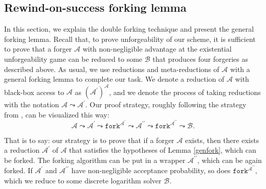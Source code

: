 \documentclass{mrl}
\theoremstyle{definition}
\numberwithin{theorem}{subsection}
\newcommand{\adversary}{\mathcal{A}}
\newcommand{\reduxChain}{\adversary \leadsto \adversary^\prime \leadsto \texttt{fork}^{\adversary^\prime}  \leadsto \adversary^{\prime \prime} \leadsto \texttt{fork}^{\adversary^{\prime \prime}} \leadsto \mathcal{B}}
\begin{document}
\subsection{Rewind-on-success forking lemma}\label{forkingLemma}

In this section, we explain the double forking technique and present the general forking lemma. Recall that, to prove unforgeability of our scheme, it is sufficient to prove that a forger $\adversary$ with non-negligible advantage at the existential unforgeability game can be reduced to some $\mathcal{B}$ that produces four forgeries as described above. As usual, we use reductions and meta-reductions of $\adversary$ with a general forking lemma to complete our task. We denote a reduction of $\adversary$ with black-box access to $\adversary$ as $(\adversary^\prime)^\adversary$, and we denote the process of taking reductions with the notation $\adversary \leadsto \adversary^\prime$. Our proof strategy, roughly following the strategy from \cite{maxwell2018simple}, can be visualized this way:
\[\reduxChain.\]

That is to say: our strategy is to prove that if a forger $\mathcal{A}$ exists, then there exists a reduction $\adversary^\prime$ of $\adversary$ that satisfies the hypotheses of Lemma \ref{genfork}, which can be forked. The forking algorithm can be put in a wrapper $\adversary^{\prime \prime}$, which can be again forked. If $\adversary^\prime$ and $\adversary^{\prime \prime}$ have non-negligible acceptance probability, so does $\texttt{fork}^{\adversary^{\prime \prime}}$, which we reduce to some discrete logarithm solver $\mathcal{B}$.

\end{document}
